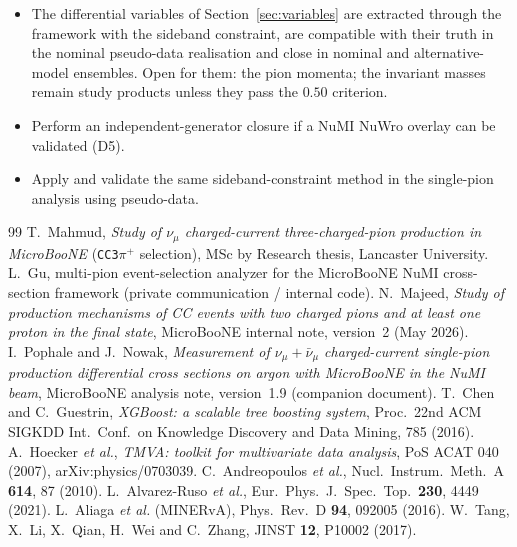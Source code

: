 \documentclass[11pt,a4paper]{article}
\newcommand{\uboone}{MicroBooNE}
\begin{document}
\begin{itemize}[nosep]
  \item The differential variables of Section~\ref{sec:variables} are extracted through the framework with the
        sideband constraint, are compatible with their truth in the nominal pseudo-data realisation and close in
        nominal and alternative-model ensembles. Open for them: the pion momenta; the invariant masses remain study products unless they pass the $0.50$
        criterion.
  \item Perform an independent-generator closure if a NuMI NuWro overlay can be validated (D5).
  \item Apply and validate the same sideband-constraint method in the single-pion analysis using pseudo-data.
\end{itemize}

\begin{thebibliography}{99}
 T.\ Mahmud, \textit{Study of $\nu_\mu$ charged-current three-charged-pion
  production in \uboone{}} (\texttt{CC3}$\pi^+$ selection), MSc by Research thesis,
  Lancaster University.
 L.\ Gu, multi-pion event-selection analyzer for the \uboone{} NuMI
  cross-section framework (private communication / internal code).
 N.\ Majeed, \textit{Study of production mechanisms of CC events with two charged pions
  and at least one proton in the final state}, \uboone{} internal note, version~2 (May 2026).
 I.\ Pophale and J.\ Nowak, \textit{Measurement of
  $\nu_\mu+\bar\nu_\mu$ charged-current single-pion production differential cross sections
  on argon with \uboone{} in the NuMI beam}, \uboone{} analysis note, version~1.9 (companion document).
 T.\ Chen and C.\ Guestrin, \textit{XGBoost: a scalable tree boosting system}, Proc.\ 22nd ACM
  SIGKDD Int.\ Conf.\ on Knowledge Discovery and Data Mining, 785 (2016).
 A.\ Hoecker \textit{et al.}, \textit{TMVA: toolkit for multivariate data analysis}, PoS ACAT 040 (2007),
  arXiv:physics/0703039.
 C.\ Andreopoulos \textit{et al.}, Nucl.\ Instrum.\ Meth.\ A \textbf{614}, 87 (2010).
 L.\ Alvarez-Ruso \textit{et al.}, Eur.\ Phys.\ J.\ Spec.\ Top.\ \textbf{230}, 4449 (2021).
 L.\ Aliaga \textit{et al.} (MINERvA), Phys.\ Rev.\ D \textbf{94}, 092005 (2016).
 W.\ Tang, X.\ Li, X.\ Qian, H.\ Wei and C.\ Zhang, JINST \textbf{12}, P10002 (2017).
\end{thebibliography}
\end{document}
